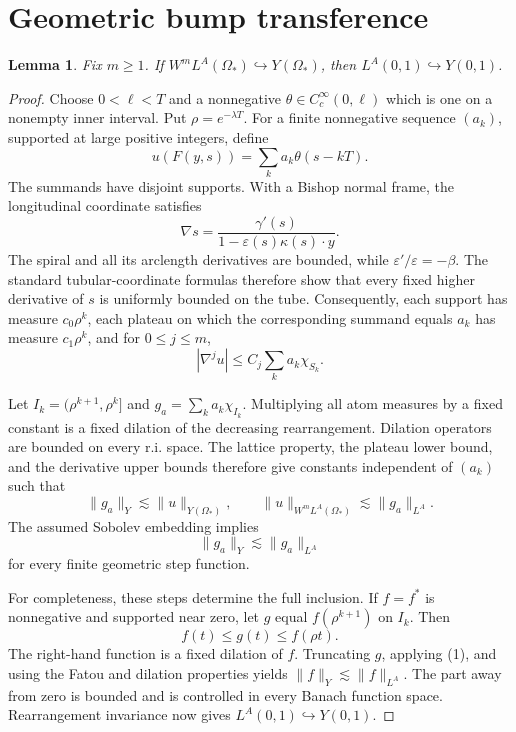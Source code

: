 \documentclass[11pt]{article}
\newtheorem{lemma}[theorem]{Lemma}
\begin{document}
\section{Geometric bump transference}

\begin{lemma}\label{lem:bumps}
Fix $m\geq1$.  If
$W^mL^A(\Omega_*)\hookrightarrow Y(\Omega_*)$, then
$L^A(0,1)\hookrightarrow Y(0,1)$.
\end{lemma}

\begin{proof}
Choose $0<\ell<T$ and a nonnegative
$\theta\in C_c^\infty(0,\ell)$ which is one on a nonempty inner interval.
Put $\rho=e^{-\lambda T}$.  For a finite nonnegative sequence $(a_k)$, supported at
large positive integers, define
\[
 u(F(y,s))=\sum_k a_k\theta(s-kT).
\]
The summands have disjoint supports.  With a Bishop normal frame, the
longitudinal coordinate satisfies
\[
 \nabla s=\frac{\gamma'(s)}{1-\varepsilon(s)\kappa(s)\cdot y}.
\]
The spiral and all its arclength derivatives are bounded, while
$\varepsilon'/\varepsilon=-\beta$.  The standard tubular-coordinate formulas
therefore show that every fixed higher derivative of $s$ is uniformly bounded
on the tube.  Consequently, each support has measure
$c_0\rho^k$, each plateau on which the corresponding summand equals $a_k$
has measure $c_1\rho^k$, and for $0\leq j\leq m$,
\[
 |\nabla^j u|\leq C_j\sum_k a_k\chi_{S_k}.
\]

Let $I_k=(\rho^{k+1},\rho^k]$ and
$g_a=\sum_k a_k\chi_{I_k}$.  Multiplying all atom measures by a fixed
constant is a fixed dilation of the decreasing rearrangement.  Dilation
operators are bounded on every r.i. space.  The lattice property, the plateau
lower bound, and the derivative upper bounds therefore give constants
independent of $(a_k)$ such that
\[
 \|g_a\|_Y\lesssim\|u\|_{Y(\Omega_*)},
 \qquad
 \|u\|_{W^mL^A(\Omega_*)}\lesssim\|g_a\|_{L^A}.
\]
The assumed Sobolev embedding implies
\[
 \|g_a\|_Y\lesssim\|g_a\|_{L^A}                     \tag{1}
\]
for every finite geometric step function.

For completeness, these steps determine the full inclusion.  If $f=f^*$ is
nonnegative and supported near zero, let $g$ equal
$f(\rho^{k+1})$ on $I_k$.  Then
\[
 f(t)\leq g(t)\leq f(\rho t).
\]
The right-hand function is a fixed dilation of $f$.  Truncating $g$, applying
(1), and using the Fatou and dilation properties yields
$\|f\|_Y\lesssim\|f\|_{L^A}$.  The part away from zero is bounded and is
controlled in every Banach function space.  Rearrangement invariance now gives
$L^A(0,1)\hookrightarrow Y(0,1)$.
\end{proof}
\end{document}
